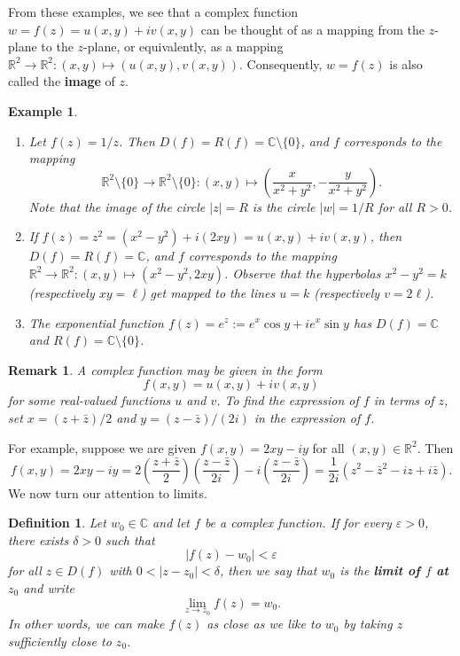 \documentclass[10pt]{article}
\newcommand{\eps}{\varepsilon}
\newcommand{\R}{\mathbb{R}}
\newcommand{\C}{\mathbb{C}}
\theoremstyle{newstyle}
\newtheorem{remark}[thm]{Remark}
\newtheorem{defn}[thm]{Definition}
\newtheorem{exmp}[thm]{Example}
\begin{document}
From these examples, we see that a complex function $w = f(z) = u(x,y) +iv(x,y)$ can be thought of 
as a mapping from the $z$-plane to the $z$-plane, or equivalently, as a mapping 
$\R^2 \to \R^2 : (x, y) \mapsto (u(x, y), v(x, y))$. Consequently, $w = f(z)$ is also called the 
{\bf image} of $z$. 

\begin{exmp}~
\begin{enumerate}[(1)]
    \item Let $f(z) = 1/z$. Then $D(f) = R(f) = \C \setminus \{0\}$, and $f$ corresponds to the 
    mapping 
    \[ \R^2 \setminus \{0\} \to \R^2 \setminus \{0\} : (x, y) \mapsto 
    \left( \frac{x}{x^2+y^2}, -\frac{y}{x^2+y^2} \right). \]
    Note that the image of the circle $|z| = R$ is the circle $|w| = 1/R$ for all $R > 0$.
    \item If $f(z) = z^2 = (x^2 - y^2) + i(2xy) = u(x, y) + iv(x, y)$, then $D(f) = R(f) = \C$, 
    and $f$ corresponds to the mapping $\R^2 \to \R^2 : (x, y) \mapsto (x^2 - y^2, 2xy)$. 
    Observe that the hyperbolas $x^2 - y^2 = k$ (respectively $xy = \ell$) get mapped to the 
    lines $u = k$ (respectively $v = 2\ell$).
    \item The exponential function $f(z) = e^z := e^x\cos y + ie^x \sin y$ has
    $D(f) = \C$ and $R(f) = \C \setminus \{0\}$. 
\end{enumerate}
\end{exmp}

\begin{remark}
A complex function may be given in the form 
\[ f(x, y) = u(x, y) + iv(x, y) \]
for some real-valued functions $u$ and $v$. To find the expression of $f$ in terms of $z$, set 
$x = (z+\bar{z})/2$ and $y = (z-\bar{z})/(2i)$ in the expression of $f$. 
\end{remark}

For example, suppose we are given $f(x, y) = 2xy - iy$ for all $(x, y) \in \R^2$. Then 
\[ f(x, y) = 2xy - iy = 2 \left( \frac{z+\bar{z}}2 \right) \left( \frac{z-\bar{z}}{2i} \right) 
- i \left( \frac{z-\bar{z}}{2i} \right) = \frac{1}{2i} (z^2 - \bar{z}^2 - iz + i\bar{z}). \]
We now turn our attention to limits. 

\begin{defn}
Let $w_0 \in \C$ and let $f$ be a complex function. If for every $\eps > 0$, there exists 
$\delta > 0$ such that 
\[ |f(z) - w_0| < \eps \]
for all $z \in D(f)$ with $0 < |z-z_0| < \delta$, then we say that $w_0$ is the 
{\bf limit of $f$ at $z_0$} and write 
\[ \lim_{z\to z_0} f(z) = w_0. \]
In other words, we can make $f(z)$ as close as we like to $w_0$ by taking $z$ sufficiently close to $z_0$.
\end{defn}
\end{document}
